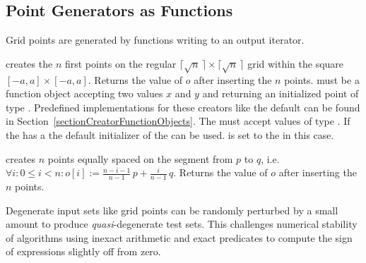 \subsection{Point Generators as Functions}


Grid points are generated by functions writing to an output iterator.

\def\ccLongParamLayout{\ccTrue}
{ creates the $n$ first points on the regular $\lceil\sqrt{n}\,\rceil
    \times \lceil  \sqrt{n}\,\rceil$ grid within the square
    $[-a,a]\times [-a,a]$. Returns the value of $o$ after inserting
    the $n$ points. 
    \ccPrecond {} must be a function object accepting two
     values $x$ and $y$ and returning an initialized point
     of type . Predefined implementations for these
    creators like the default can be found in
    Section~\ref{sectionCreatorFunctionObjects}. The
     must accept values of type . If the
     has a  the default
    initializer of the  can be used.  is set to
    the  in this case.}
\def\ccLongParamLayout{\ccFalse}


{ creates $n$ points equally spaced on the segment from $p$ to $q$,
    i.e.~$\forall i: 0 \le i < n: o[i] := \frac{n-i-1}{n-1}\, p +
    \frac{i}{n-1}\, q$. Returns the value of $o$ after inserting
    the $n$ points.}


Degenerate input sets like grid points can be randomly perturbed by a
small amount to produce {\em quasi}-degenerate test sets. This
challenges numerical stability of algorithms using inexact arithmetic and
exact predicates to compute the sign of expressions slightly off from zero.

